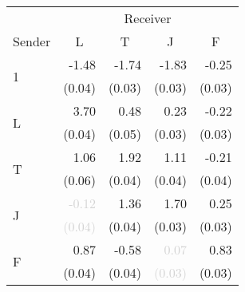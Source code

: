 \begin{tabular}{lrrrr}
\toprule
& \multicolumn{4}{c}{Receiver} \\
\cmidrule(l){2-5}
Sender & \multicolumn{1}{c}{L} & \multicolumn{1}{c}{T} & \multicolumn{1}{c}{J} & \multicolumn{1}{c}{F} \\
\midrule
\multirow{2}{*}{1} &-1.48 &-1.74 &-1.83 &-0.25\\
 &\scriptsize{(0.04)} &\scriptsize{(0.03)} &\scriptsize{(0.03)} &\scriptsize{(0.03)}\\[1ex]
\multirow{2}{*}{L} &\cellcolor{Gray}3.70 &0.48 &0.23 &-0.22\\
 &\cellcolor{Gray}\scriptsize{(0.04)} &\scriptsize{(0.05)} &\scriptsize{(0.03)} &\scriptsize{(0.03)}\\[1ex]
\multirow{2}{*}{T} &1.06 &\cellcolor{Gray}1.92 &1.11 &-0.21\\
 &\scriptsize{(0.06)} &\cellcolor{Gray}\scriptsize{(0.04)} &\scriptsize{(0.04)} &\scriptsize{(0.04)}\\[1ex]
\multirow{2}{*}{J} &\textcolor{LightGray}{-0.12} &1.36 &\cellcolor{Gray}1.70 &0.25\\
 &\textcolor{LightGray}{\scriptsize{(0.04)}} &\scriptsize{(0.04)} &\cellcolor{Gray}\scriptsize{(0.03)} &\scriptsize{(0.03)}\\[1ex]
\multirow{2}{*}{F} &0.87 &-0.58 &\textcolor{LightGray}{0.07} &\cellcolor{Gray}0.83\\
 &\scriptsize{(0.04)} &\scriptsize{(0.04)} &\textcolor{LightGray}{\scriptsize{(0.03)}} &\cellcolor{Gray}\scriptsize{(0.03)}\\[1ex]
\bottomrule
\end{tabular}
